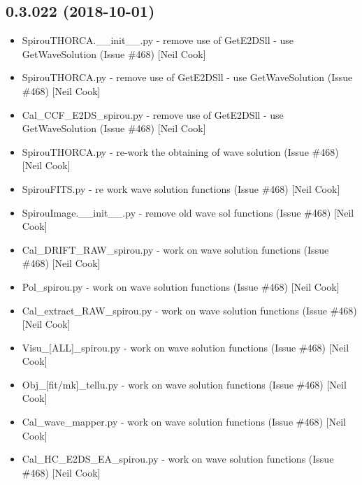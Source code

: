 \documentclass[a4paper,10pt,english]{report}
\begin{document}
\subsection{0.3.022 (2018-10-01)}
\label{\detokenize{misc/changelog:id308}}\begin{itemize}
\item {} 
SpirouTHORCA.\_\_init\_\_.py - remove use of GetE2DSll - use
GetWaveSolution (Issue \#468) {[}Neil Cook{]}

\item {} 
SpirouTHORCA.py - remove use of GetE2DSll - use GetWaveSolution (Issue
\#468) {[}Neil Cook{]}

\item {} 
Cal\_CCF\_E2DS\_spirou.py - remove use of GetE2DSll - use GetWaveSolution
(Issue \#468) {[}Neil Cook{]}

\item {} 
SpirouTHORCA.py - re-work the obtaining of wave solution (Issue \#468)
{[}Neil Cook{]}

\item {} 
SpirouFITS.py - re work wave solution functions (Issue \#468) {[}Neil
Cook{]}

\item {} 
SpirouImage.\_\_init\_\_.py - remove old wave sol functions (Issue \#468)
{[}Neil Cook{]}

\item {} 
Cal\_DRIFT\_RAW\_spirou.py - work on wave solution functions (Issue \#468)
{[}Neil Cook{]}

\item {} 
Pol\_spirou.py - work on wave solution functions (Issue \#468) {[}Neil
Cook{]}

\item {} 
Cal\_extract\_RAW\_spirou.py - work on wave solution functions (Issue
\#468) {[}Neil Cook{]}

\item {} 
Visu\_{[}ALL{]}\_spirou.py - work on wave solution functions (Issue \#468)
{[}Neil Cook{]}

\item {} 
Obj\_{[}fit/mk{]}\_tellu.py - work on wave solution functions (Issue \#468)
{[}Neil Cook{]}

\item {} 
Cal\_wave\_mapper.py - work on wave solution functions (Issue \#468)
{[}Neil Cook{]}

\item {} 
Cal\_HC\_E2DS\_EA\_spirou.py - work on wave solution functions (Issue
\#468) {[}Neil Cook{]}


\end{itemize}
\end{document}
